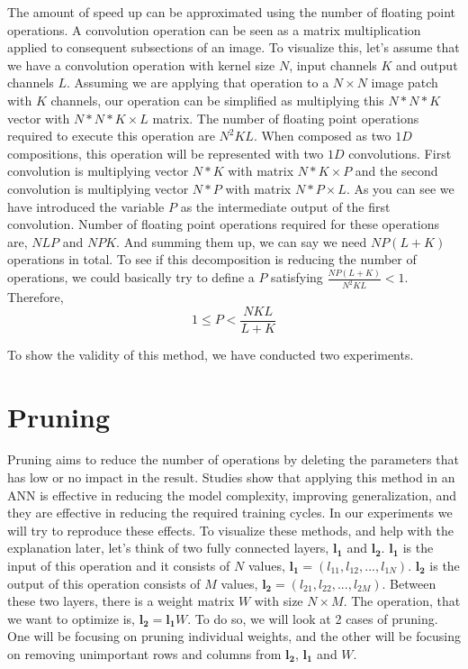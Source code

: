 The amount of speed up can be approximated using the number of floating point operations. A convolution operation can be seen as a matrix multiplication applied to consequent subsections of an image. To visualize this, let's assume that we have a convolution operation with kernel size $N$, input channels $K$ and output channels $L$. Assuming we are applying that operation to a $N \times N$ image patch with $K$ channels, our operation can be simplified as multiplying this $N*N*K$ vector with $N*N*K \times L$ matrix. The number of floating point operations required to execute this operation are $N^2KL$. When composed as two $1D$ compositions, this operation will be represented with two $1D$ convolutions. First convolution is multiplying vector $N*K$ with matrix $N*K \times P$ and the second convolution is multiplying vector $N*P$ with matrix $N*P \times L$. As you can see we have introduced the variable $P$ as the intermediate output of the first convolution. Number of floating point operations required for these operations are, $NLP$ and $NPK$. And summing them up, we can say we need $NP(L + K)$ operations in total. To see if this decomposition is reducing the number of operations, we could basically try to define a $P$ satisfying $\frac{NP(L+K)}{N^2KL} < 1$. Therefore,
\begin{equation*}
1 \leq P < \frac{NKL}{L+K}
\end{equation*}

To show the validity of this method, we have conducted two experiments. 

\section{Pruning}
Pruning aims to reduce the number of operations by deleting the parameters that has low or no impact in the result. Studies show that applying this method in an ANN is effective in reducing the model complexity, improving generalization, and they are effective in reducing the required training cycles. In our experiments we will try to reproduce these effects.
To visualize these methods, and help with the explanation later, let's think of two fully connected layers, $\mathbf{l_1}$ and $\mathbf{l_2}$. $\mathbf{l_1}$ is the input of this operation and it consists of $N$ values, $\mathbf{l_1}=(l_{11}, l_{12}, ..., l_{1N})$. $\mathbf{l_2}$ is the output of this operation consists of $M$ values, $\mathbf{l_2}=(l_{21}, l_{22}, ..., l_{2M})$. Between these two layers, there is a weight matrix $W$ with size $N \times M$. The operation, that we want to optimize is, $\mathbf{l_2} = \mathbf{l_1}W$. To do so, we will look at 2 cases of pruning. One will be focusing on pruning individual weights, and the other will be focusing on removing unimportant rows and columns from $\mathbf{l_2}$, $\mathbf{l_1}$ and $W$. 

